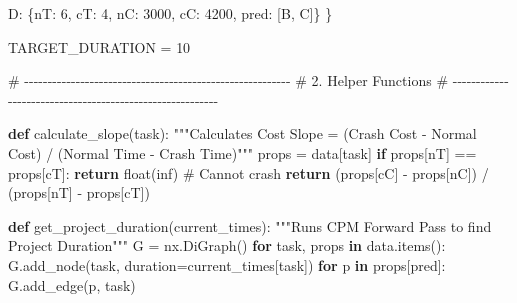 \documentclass[
  letterpaper,
  DIV=11,
  numbers=noendperiod]{scrreprt}
\newenvironment{Shaded}{\begin{snugshade}}{\end{snugshade}}
\newcommand{\BuiltInTok}[1]{\textcolor[rgb]{0.00,0.23,0.31}{#1}}
\newcommand{\CommentTok}[1]{\textcolor[rgb]{0.37,0.37,0.37}{#1}}
\newcommand{\ControlFlowTok}[1]{\textcolor[rgb]{0.00,0.23,0.31}{\textbf{#1}}}
\newcommand{\DecValTok}[1]{\textcolor[rgb]{0.68,0.00,0.00}{#1}}
\newcommand{\KeywordTok}[1]{\textcolor[rgb]{0.00,0.23,0.31}{\textbf{#1}}}
\newcommand{\NormalTok}[1]{\textcolor[rgb]{0.00,0.23,0.31}{#1}}
\newcommand{\OperatorTok}[1]{\textcolor[rgb]{0.37,0.37,0.37}{#1}}
\newcommand{\StringTok}[1]{\textcolor[rgb]{0.13,0.47,0.30}{#1}}
\begin{document}
\begin{Shaded}
\begin{Highlighting}[]
    \StringTok{\textquotesingle{}D\textquotesingle{}}\NormalTok{: \{}\StringTok{\textquotesingle{}nT\textquotesingle{}}\NormalTok{: }\DecValTok{6}\NormalTok{, }\StringTok{\textquotesingle{}cT\textquotesingle{}}\NormalTok{: }\DecValTok{4}\NormalTok{, }\StringTok{\textquotesingle{}nC\textquotesingle{}}\NormalTok{: }\DecValTok{3000}\NormalTok{, }\StringTok{\textquotesingle{}cC\textquotesingle{}}\NormalTok{: }\DecValTok{4200}\NormalTok{, }\StringTok{\textquotesingle{}pred\textquotesingle{}}\NormalTok{: [}\StringTok{\textquotesingle{}B\textquotesingle{}}\NormalTok{, }\StringTok{\textquotesingle{}C\textquotesingle{}}\NormalTok{]\}}
\NormalTok{\}}

\NormalTok{TARGET\_DURATION }\OperatorTok{=} \DecValTok{10}

\CommentTok{\# {-}{-}{-}{-}{-}{-}{-}{-}{-}{-}{-}{-}{-}{-}{-}{-}{-}{-}{-}{-}{-}{-}{-}{-}{-}{-}{-}{-}{-}{-}{-}{-}{-}{-}{-}{-}{-}{-}{-}{-}{-}{-}{-}{-}{-}{-}{-}{-}{-}{-}{-}{-}{-}{-}{-}{-}{-}}
\CommentTok{\# 2. Helper Functions}
\CommentTok{\# {-}{-}{-}{-}{-}{-}{-}{-}{-}{-}{-}{-}{-}{-}{-}{-}{-}{-}{-}{-}{-}{-}{-}{-}{-}{-}{-}{-}{-}{-}{-}{-}{-}{-}{-}{-}{-}{-}{-}{-}{-}{-}{-}{-}{-}{-}{-}{-}{-}{-}{-}{-}{-}{-}{-}{-}{-}}

\KeywordTok{def}\NormalTok{ calculate\_slope(task):}
    \CommentTok{"""Calculates Cost Slope = (Crash Cost {-} Normal Cost) / (Normal Time {-} Crash Time)"""}
\NormalTok{    props }\OperatorTok{=}\NormalTok{ data[task]}
    \ControlFlowTok{if}\NormalTok{ props[}\StringTok{\textquotesingle{}nT\textquotesingle{}}\NormalTok{] }\OperatorTok{==}\NormalTok{ props[}\StringTok{\textquotesingle{}cT\textquotesingle{}}\NormalTok{]: }\ControlFlowTok{return} \BuiltInTok{float}\NormalTok{(}\StringTok{\textquotesingle{}inf\textquotesingle{}}\NormalTok{) }\CommentTok{\# Cannot crash}
    \ControlFlowTok{return}\NormalTok{ (props[}\StringTok{\textquotesingle{}cC\textquotesingle{}}\NormalTok{] }\OperatorTok{{-}}\NormalTok{ props[}\StringTok{\textquotesingle{}nC\textquotesingle{}}\NormalTok{]) }\OperatorTok{/}\NormalTok{ (props[}\StringTok{\textquotesingle{}nT\textquotesingle{}}\NormalTok{] }\OperatorTok{{-}}\NormalTok{ props[}\StringTok{\textquotesingle{}cT\textquotesingle{}}\NormalTok{])}

\KeywordTok{def}\NormalTok{ get\_project\_duration(current\_times):}
    \CommentTok{"""Runs CPM Forward Pass to find Project Duration"""}
\NormalTok{    G }\OperatorTok{=}\NormalTok{ nx.DiGraph()}
    \ControlFlowTok{for}\NormalTok{ task, props }\KeywordTok{in}\NormalTok{ data.items():}
\NormalTok{        G.add\_node(task, duration}\OperatorTok{=}\NormalTok{current\_times[task])}
        \ControlFlowTok{for}\NormalTok{ p }\KeywordTok{in}\NormalTok{ props[}\StringTok{\textquotesingle{}pred\textquotesingle{}}\NormalTok{]:}
\NormalTok{            G.add\_edge(p, task)}
            

\end{Highlighting}
\end{Shaded}
\end{document}
